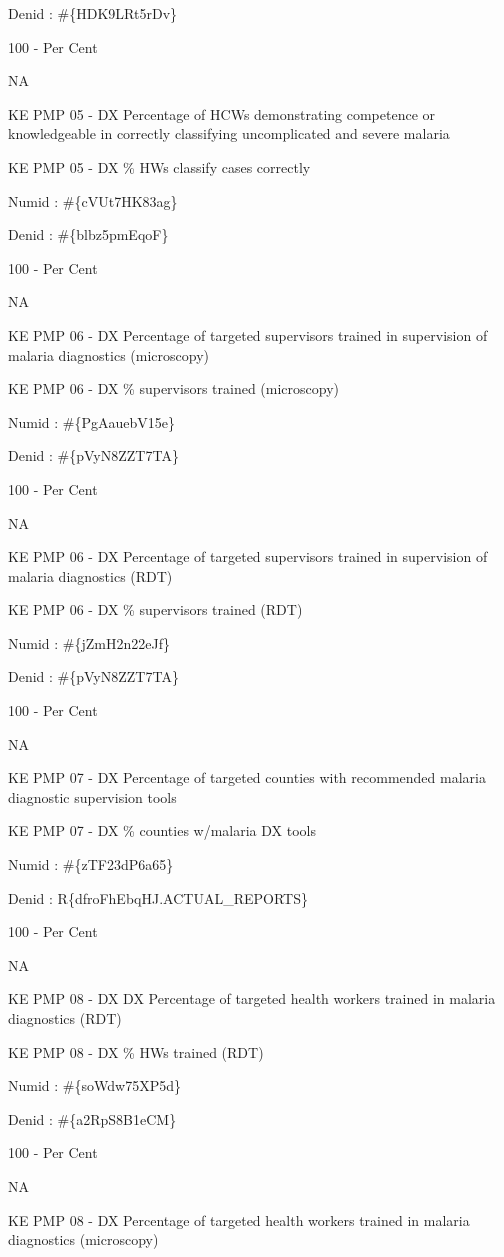 \documentclass[]{book}
\begin{document}
Denid : \#\{HDK9LRt5rDv\}

100 - Per Cent

NA

KE PMP 05 - DX Percentage of HCWs demonstrating competence or knowledgeable in correctly classifying uncomplicated and severe malaria

KE PMP 05 - DX \% HWs classify cases correctly

Numid : \#\{cVUt7HK83ag\}

Denid : \#\{blbz5pmEqoF\}

100 - Per Cent

NA

KE PMP 06 - DX Percentage of targeted supervisors trained in supervision of malaria diagnostics (microscopy)

KE PMP 06 - DX \% supervisors trained (microscopy)

Numid : \#\{PgAauebV15e\}

Denid : \#\{pVyN8ZZT7TA\}

100 - Per Cent

NA

KE PMP 06 - DX Percentage of targeted supervisors trained in supervision of malaria diagnostics (RDT)

KE PMP 06 - DX \% supervisors trained (RDT)

Numid : \#\{jZmH2n22eJf\}

Denid : \#\{pVyN8ZZT7TA\}

100 - Per Cent

NA

KE PMP 07 - DX Percentage of targeted counties with recommended malaria diagnostic supervision tools

KE PMP 07 - DX \% counties w/malaria DX tools

Numid : \#\{zTF23dP6a65\}

Denid : R\{dfroFhEbqHJ.ACTUAL\_REPORTS\}

100 - Per Cent

NA

KE PMP 08 - DX DX Percentage of targeted health workers trained in malaria diagnostics (RDT)

KE PMP 08 - DX \% HWs trained (RDT)

Numid : \#\{soWdw75XP5d\}

Denid : \#\{a2RpS8B1eCM\}

100 - Per Cent

NA

KE PMP 08 - DX Percentage of targeted health workers trained in malaria diagnostics (microscopy)
\end{document}
